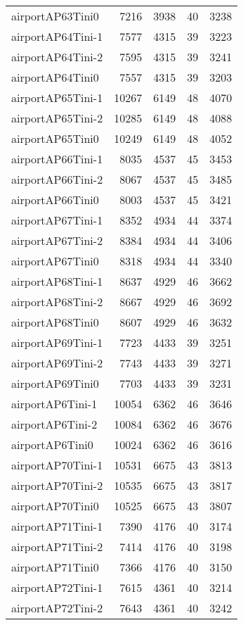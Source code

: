 \begin{longtable}{lrrrr}
airportAP63Tini0 & 7216 & 3938 & 40 & 3238 \\
airportAP64Tini-1 & 7577 & 4315 & 39 & 3223 \\
airportAP64Tini-2 & 7595 & 4315 & 39 & 3241 \\
airportAP64Tini0 & 7557 & 4315 & 39 & 3203 \\
airportAP65Tini-1 & 10267 & 6149 & 48 & 4070 \\
airportAP65Tini-2 & 10285 & 6149 & 48 & 4088 \\
airportAP65Tini0 & 10249 & 6149 & 48 & 4052 \\
airportAP66Tini-1 & 8035 & 4537 & 45 & 3453 \\
airportAP66Tini-2 & 8067 & 4537 & 45 & 3485 \\
airportAP66Tini0 & 8003 & 4537 & 45 & 3421 \\
airportAP67Tini-1 & 8352 & 4934 & 44 & 3374 \\
airportAP67Tini-2 & 8384 & 4934 & 44 & 3406 \\
airportAP67Tini0 & 8318 & 4934 & 44 & 3340 \\
airportAP68Tini-1 & 8637 & 4929 & 46 & 3662 \\
airportAP68Tini-2 & 8667 & 4929 & 46 & 3692 \\
airportAP68Tini0 & 8607 & 4929 & 46 & 3632 \\
airportAP69Tini-1 & 7723 & 4433 & 39 & 3251 \\
airportAP69Tini-2 & 7743 & 4433 & 39 & 3271 \\
airportAP69Tini0 & 7703 & 4433 & 39 & 3231 \\
airportAP6Tini-1 & 10054 & 6362 & 46 & 3646 \\
airportAP6Tini-2 & 10084 & 6362 & 46 & 3676 \\
airportAP6Tini0 & 10024 & 6362 & 46 & 3616 \\
airportAP70Tini-1 & 10531 & 6675 & 43 & 3813 \\
airportAP70Tini-2 & 10535 & 6675 & 43 & 3817 \\
airportAP70Tini0 & 10525 & 6675 & 43 & 3807 \\
airportAP71Tini-1 & 7390 & 4176 & 40 & 3174 \\
airportAP71Tini-2 & 7414 & 4176 & 40 & 3198 \\
airportAP71Tini0 & 7366 & 4176 & 40 & 3150 \\
airportAP72Tini-1 & 7615 & 4361 & 40 & 3214 \\
airportAP72Tini-2 & 7643 & 4361 & 40 & 3242 \\

\end{longtable}
